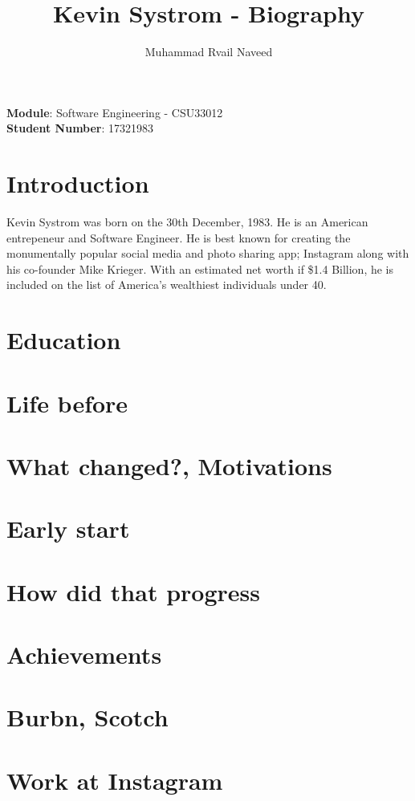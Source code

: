 \documentclass{article}
\title{\textbf{Kevin  Systrom -  Biography}}
\author{Muhammad Rvail Naveed}
\date{}
\begin{document}
    \maketitle

    \begin{center}
        \textbf{Module}: Software Engineering - CSU33012 \\
        \textbf{Student Number}: 17321983 
    \end{center}

    \newpage

    \section{Introduction}
        Kevin Systrom was born on the 30th December, 1983. He is 
        an American entrepeneur and Software Engineer. He is best known for creating the monumentally
        popular social media and photo sharing app; Instagram along with his co-founder Mike Krieger. With an estimated net
        worth if \$1.4 Billion, he is included on the list of America's wealthiest individuals under 40.

    \section{Education}

    \section{Life before}
    \section{What changed?, Motivations}
    \section{Early start}
    \section{How did that progress}
    \section{Achievements}
    \section{Burbn, Scotch}
    \section{Work at Instagram}
\end{document}
